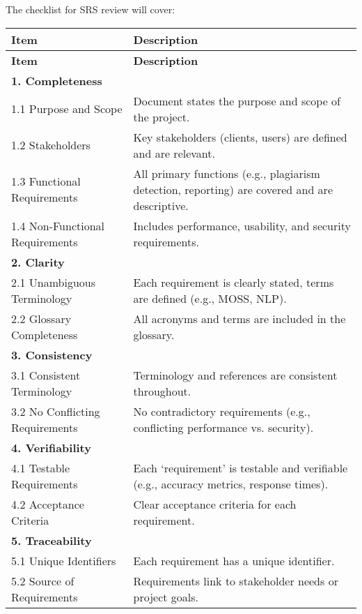 \documentclass[12pt, titlepage]{article}
\begin{document}
\pagebreak

The checklist for SRS review will cover:

\begin{center}
  \begin{longtable}{|p{4cm}|p{11cm}|}
  \hline
  \textbf{Item} & \textbf{Description} \\
  \hline
  \endfirsthead
  \hline
  \textbf{Item} & \textbf{Description} \\
  \hline
  \endhead
  
  \textbf{1. Completeness} & \\
  \hline
  1.1 Purpose and Scope & Document states the purpose and scope of the project. \\
  \hline
  1.2 Stakeholders & Key stakeholders (clients, users) are defined and are relevant. \\
  \hline
  1.3 Functional Requirements & All primary functions (e.g., plagiarism detection, reporting) are covered and are descriptive. \\
  \hline
  1.4 Non-Functional Requirements & Includes performance, usability, and security requirements. \\
  \hline
  \textbf{2. Clarity} & \\
  \hline
  2.1 Unambiguous Terminology & Each requirement is clearly stated, terms are defined (e.g., MOSS, NLP). \\
  \hline
  2.2 Glossary Completeness & All acronyms and terms are included in the glossary. \\
  \hline
  \textbf{3. Consistency} & \\
  \hline
  3.1 Consistent Terminology & Terminology and references are consistent throughout. \\
  \hline
  3.2 No Conflicting Requirements & No contradictory requirements (e.g., conflicting performance vs. security). \\
  \hline
  \textbf{4. Verifiability} & \\
  \hline
  4.1 Testable Requirements & Each `requirement' is testable and verifiable (e.g., accuracy metrics, response times). \\
  \hline
  4.2 Acceptance Criteria & Clear acceptance criteria for each requirement. \\
  \hline
  \textbf{5. Traceability} & \\
  \hline
  5.1 Unique Identifiers & Each requirement has a unique identifier. \\
  \hline
  5.2 Source of Requirements & Requirements link to stakeholder needs or project goals. \\

\end{longtable}
\end{center}
\end{document}
